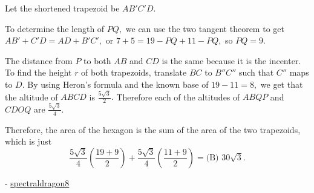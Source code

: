 \begin{enumerate}
 Let the shortened trapezoid be $AB'C'D.$

 To determine the length of $PQ,$ we can use the two tangent theorem to get $AB' + C'D = AD + B'C',$ or $7+5=19-PQ+11-PQ,$ so $PQ = 9.$

 The distance from $P$ to both $AB$ and $CD$ is the same because it is the incenter. To find the height $r$ of both trapezoids, translate $BC$ to $B''C''$ such that $C''$ maps to $D.$ By using Heron's formula and the known base of $19-11=8,$ we get that the altitude of $ABCD$ is $\frac{5\sqrt{3}}{2}.$ Therefore each of the altitudes of $ABQP$ and $CDOQ$ are $\frac{5\sqrt{3}}{4}.$

 Therefore, the area of the hexagon is the sum of the area of the two trapezoids, which is just 
 \[\frac{5\sqrt{3}}{4} \left( \dfrac{19+9}{2}\right) + \frac{5\sqrt{3}}{4} \left( \dfrac{11+9}{2}\right) = \boxed{\text{(B) }30\sqrt{3}}.\]

 - \href{https://artofproblemsolving.com/wiki/index.php/User:Spectraldragon8}{spectraldragon8}

 


\end{enumerate}